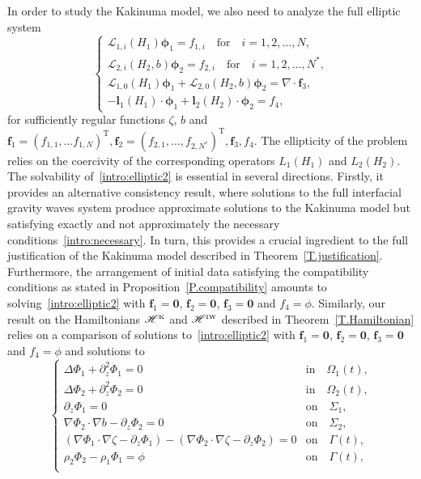\documentclass[11pt,leqno]{article}
\numberwithin{equation}{section}
\numberwithin{figure}{section}
\begin{document}
In order to study the Kakinuma model, we also need to analyze the full elliptic system
\begin{equation}\label{intro:elliptic2}
	\begin{cases}
		\mathcal{L}_{1,i}(H_1) {\bm \phi}_1 = f_{1,i} \quad\mbox{for}\quad i=1,2,\ldots,N, \\
		\mathcal{L}_{2,i}(H_2,b) {\bm \phi}_2 = f_{2,i} \quad\mbox{for}\quad i=1,2,\ldots,N^*, \\
		\mathcal{L}_{1,0}(H_1) {\bm \phi}_1
		+ \mathcal{L}_{2,0}(H_2,b) {\bm \phi}_2  = \nabla\cdot {\bm f}_3,\\
		-\bm{l}_1(H_1)\cdot\bm{\phi}_1+\bm{l}_2(H_2)\cdot\bm{\phi}_2=f_4,
	\end{cases}
\end{equation}
for sufficiently regular functions $\zeta$, $b$ and ${\bm f}_1=(f_{1,1},\ldots f_{1,N})^\mathrm{T},{\bm f}_2=(f_{2,1},\ldots,f_{2,N^*})^\mathrm{T},{\bm f}_3,f_4$. The ellipticity of the problem relies on the coercivity of the corresponding operators $L_1(H_1)$ and $L_2(H_2)$. The solvability of~\eqref{intro:elliptic2} is essential in several directions. Firstly, it provides an alternative consistency result, where solutions to the full interfacial gravity waves system produce approximate solutions to the Kakinuma model but satisfying exactly and not approximately the necessary conditions~\eqref{intro:necessary}. 
In turn, this provides a crucial ingredient to the full justification of the Kakinuma model described in Theorem~\ref{T.justification}.
Furthermore, the arrangement of initial data 
satisfying the compatibility conditions as stated in Proposition~\ref{P.compatibility} amounts to solving~\eqref{intro:elliptic2} 
with ${\bm f}_1={\bm 0}$, ${\bm f}_2={\bm 0}$, ${\bm f}_3={\bm 0}$ and $f_4=\phi$.
Similarly, our result on the Hamiltonians $\mathscr{H}^{\mbox{\rm\tiny K}}$ and $\mathscr{H}^{\mbox{\rm\tiny IW}}$ described in Theorem~\ref{T.Hamiltonian} relies on a comparison of solutions to~\eqref{intro:elliptic2} with ${\bm f}_1={\bm 0}$, ${\bm f}_2={\bm 0}$, ${\bm f}_3={\bm 0}$ and $f_4=\phi$ and solutions to
\[
\begin{cases}
	\Delta\Phi_1 + \partial_z^2\Phi_1 = 0 & \mbox{in}\quad \Omega_1(t), \\
	\Delta\Phi_2 + \partial_z^2\Phi_2 = 0 & \mbox{in}\quad \Omega_2(t), \\
	\partial_z\Phi_1 = 0 & \mbox{on}\quad \Sigma_1, \\
	\nabla\Phi_2 \cdot \nabla b - \partial_z\Phi_2 = 0
	& \mbox{on}\quad \Sigma_2,\\
	(\nabla\Phi_1 \cdot \nabla \zeta - \partial_z\Phi_1)  -(\nabla\Phi_2 \cdot \nabla \zeta - \partial_z\Phi_2)=0 & \mbox{on}\quad \Gamma(t), \\
	\rho_2\Phi_2-\rho_1\Phi_1 = \phi& \mbox{on}\quad \Gamma(t), \\
\end{cases}
\]
\end{document}
